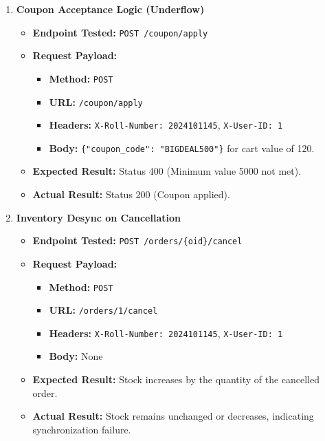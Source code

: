 \documentclass{article}
\begin{document}
\begin{enumerate}
    \item \textbf{Coupon Acceptance Logic (Underflow)}
    \begin{itemize}
        \item \textbf{Endpoint Tested:} \texttt{POST /coupon/apply}
        \item \textbf{Request Payload:} 
        \begin{itemize}
            \item \textbf{Method:} \texttt{POST}
            \item \textbf{URL:} \texttt{/coupon/apply}
            \item \textbf{Headers:} \texttt{X-Roll-Number: 2024101145}, \texttt{X-User-ID: 1}
            \item \textbf{Body:} \texttt{\{"coupon_code": "BIGDEAL500"\}} for cart value of 120.
        \end{itemize}
        \item \textbf{Expected Result:} Status 400 (Minimum value 5000 not met).
        \item \textbf{Actual Result:} Status 200 (Coupon applied).
    \end{itemize}

    \item \textbf{Inventory Desync on Cancellation}
    \begin{itemize}
        \item \textbf{Endpoint Tested:} \texttt{POST /orders/\{oid\}/cancel}
        \item \textbf{Request Payload:} 
        \begin{itemize}
            \item \textbf{Method:} \texttt{POST}
            \item \textbf{URL:} \texttt{/orders/1/cancel}
            \item \textbf{Headers:} \texttt{X-Roll-Number: 2024101145}, \texttt{X-User-ID: 1}
            \item \textbf{Body:} None
        \end{itemize}
        \item \textbf{Expected Result:} Stock increases by the quantity of the cancelled order.
        \item \textbf{Actual Result:} Stock remains unchanged or decreases, indicating synchronization failure.
    \end{itemize}
\end{enumerate}
\end{document}
